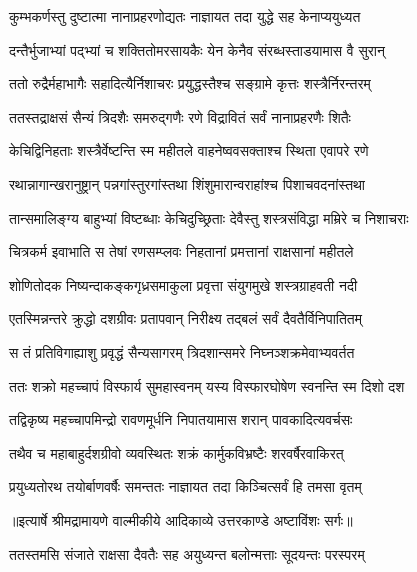 \twolineshloka
{कुम्भकर्णस्तु दुष्टात्मा नानाप्रहरणोद्यतः}
{नाज्ञायत तदा युद्धे सह केनाप्ययुध्यत} %

\twolineshloka
{दन्तैर्भुजाभ्यां पद्भ्यां च शक्तितोमरसायकैः}
{येन केनैव संरब्धस्ताडयामास वै सुरान्} %

\twolineshloka
{ततो रुद्रैर्महाभागैः सहादित्यैर्निशाचरः}
{प्रयुद्धस्तैश्च सङ्ग्रामे कृत्तः शस्त्रैर्निरन्तरम्} %

\twolineshloka
{ततस्तद्राक्षसं सैन्यं त्रिदशैः समरुद्गणैः}
{रणे विद्रावितं सर्वं नानाप्रहरणैः शितैः} %

\twolineshloka
{केचिद्विनिहताः शस्त्रैर्वेष्टन्ति स्म महीतले}
{वाहनेष्ववसक्ताश्च स्थिता एवापरे रणे} %

\twolineshloka
{रथान्नागान्खरानुष्ट्रान् पन्नगांस्तुरगांस्तथा}
{शिंशुमारान्वराहांश्च पिशाचवदनांस्तथा} %

\twolineshloka
{तान्समालिङ्ग्य बाहुभ्यां विष्टब्धाः केचिदुच्छ्रिताः}
{देवैस्तु शस्त्रसंविद्धा मम्रिरे च निशाचराः} %

\twolineshloka
{चित्रकर्म इवाभाति स तेषां रणसम्प्लवः}
{निहतानां प्रमत्तानां राक्षसानां महीतले} %

\twolineshloka
{शोणितोदक निष्यन्दाकङ्कगृध्रसमाकुला}
{प्रवृत्ता संयुगमुखे शस्त्रग्राहवती नदी} %

\twolineshloka
{एतस्मिन्नन्तरे क्रुद्धो दशग्रीवः प्रतापवान्}
{निरीक्ष्य तद्बलं सर्वं दैवतैर्विनिपातितम्} %

\twolineshloka
{स तं प्रतिविगाह्याशु प्रवृद्धं सैन्यसागरम्}
{त्रिदशान्समरे निघ्नञ्शक्रमेवाभ्यवर्तत} %

\twolineshloka
{ततः शक्रो महच्चापं विस्फार्य सुमहास्वनम्}
{यस्य विस्फारघोषेण स्वनन्ति स्म दिशो दश} %

\twolineshloka
{तद्विकृष्य महच्चापमिन्द्रो रावणमूर्धनि}
{निपातयामास शरान् पावकादित्यवर्चसः} %

\twolineshloka
{तथैव च महाबाहुर्दशग्रीवो व्यवस्थितः}
{शक्रं कार्मुकविभ्रष्टैः शरवर्षैरवाकिरत्} %

\twolineshloka
{प्रयुध्यतोरथ तयोर्बाणवर्षैः समन्ततः}
{नाज्ञायत तदा किञ्चित्सर्वं हि तमसा वृतम्} %


{॥इत्यार्षे श्रीमद्रामायणे वाल्मीकीये आदिकाव्ये उत्तरकाण्डे अष्टाविंशः सर्गः॥}


\twolineshloka
{ततस्तमसि संजाते राक्षसा दैवतैः सह}
{अयुध्यन्त बलोन्मत्ताः सूदयन्तः परस्परम्} %

